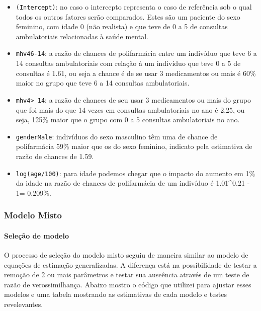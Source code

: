 \documentclass[
  11pt,
]{article}
\begin{document}
\begin{itemize}
\item
  \texttt{(Intercept)}: no caso o intercepto representa o caso de referência sob o qual todos os outros fatores serão comparados. Estes são um paciente do sexo feminino, com idade 0 (não realista) e que teve de 0 a 5 de consultas ambulatoriais relacionadas à saúde mental.
\item
  \texttt{mhv46-14}: a razão de chances de polifarmácia entre um indivíduo que teve 6 a 14 consultas ambulatoriais com relação à um indivíduo que teve 0 a 5 de consultas é 1.61, ou seja a chance é de se usar 3 medicamentos ou mais é 60\% maior no grupo que teve 6 a 14 consultas ambulatoriais.
\item
  \texttt{mhv4\textgreater{}\ 14}: a razão de chances de seu usar 3 medicamentos ou mais do grupo que foi mais do que 14 vezes em consultas ambulatoriais no ano é 2.25, ou seja, 125\% maior que o grupo com 0 a 5 consultas ambulatoriais no ano.
\item
  \texttt{genderMale}: indivíduos do sexo masculino têm uma de chance de polifarmácia 59\% maior que os do sexo feminino, indicato pela estimativa de razão de chances de 1.59.
\item
  \texttt{log(age/100)}: para idade podemos chegar que o impacto do aumento em 1\% da idade na razão de chances de polifarmácia de um indivíduo é 1.01\^{}0.21 - 1=
  0.209\%.
\end{itemize}

\hypertarget{modelo-misto}{%
\subsubsection{Modelo Misto}\label{modelo-misto}}

\hypertarget{seleuxe7uxe3o-de-modelo-1}{%
\paragraph{Seleção de modelo}\label{seleuxe7uxe3o-de-modelo-1}}

O processo de seleção do modelo misto seguiu de maneira similar ao modelo de equações de estimação generalizadas. A diferença está na possibilidade de testar a remoção de 2 ou mais parâmetros e testar sua auseência através de um teste de razão de verossimilhança. Abaixo mostro o código que utilizei para ajustar esses modelos e uma tabela mostrando as estimativas de cada modelo e testes revelevantes.
\end{document}
